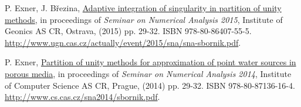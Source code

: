 \documentclass[bibliography=totocnumbered,dvipsnames,FM,Dis, EN]{tulthesis_autoreferat}
\begin{document}
\begin{itemize}[label={}, leftmargin=*]
{\item
P. Exner, J. B{\v r}ezina, \href{http://www.ugn.cas.cz/actually/event/2015/sna/sna-sbornik.pdf}{Adaptive integration of singularity in partition of unity methods},
in proceedings of \emph{Seminar on Numerical Analysis 2015}, Institute of Geonics AS CR, Ostrava, (2015) pp. 29-32. ISBN 978-80-86407-55-5. \\
\url{http://www.ugn.cas.cz/actually/event/2015/sna/sna-sbornik.pdf}.

\item
P. Exner, \href{http://www.cs.cas.cz/sna2014/sbornik.pdf}{Partition of unity methods for approximation of point water sources in porous media},
in proceedings of \emph{Seminar on Numerical Analysis 2014}, Institute of Computer Science AS CR, Prague, (2014) pp. 29-32. ISBN 978-80-87136-16-4.\\
\url{http://www.cs.cas.cz/sna2014/sbornik.pdf}.
}
% 
% 
% 
% 

\end{itemize}
\end{document}
